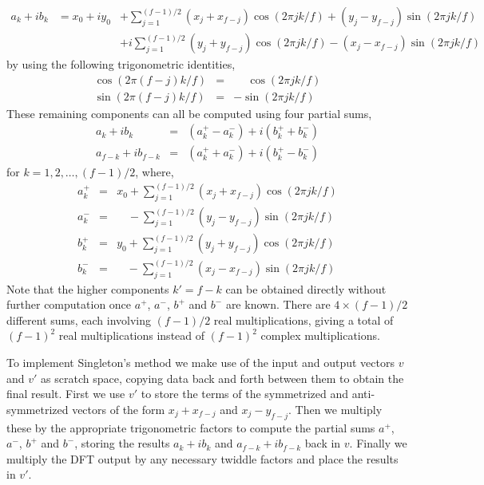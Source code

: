 \documentclass[fleqn,12pt]{article}
\begin{document}
%
\begin{eqnarray}
a_k + i b_k & =   x_0 + i y_0 & + 
  \sum_{j=1}^{(f-1)/2} (x_j + x_{f-j}) \cos(2\pi jk/f)
 + (y_j - y_{f-j}) \sin(2\pi jk/f) \\
& & + i\sum_{j=1}^{(f-1)/2} (y_j + y_{f-j}) \cos(2\pi jk/f) 
 - (x_j - x_{f-j}) \sin(2\pi jk/f)
\end{eqnarray}
%
by using the following trigonometric identities,
%
\begin{eqnarray}
 \cos(2\pi(f-j)k/f) &=& \phantom{-}\cos(2\pi jk/f) \\
 \sin(2\pi(f-j)k/f) &=&  -\sin(2\pi jk/f)
\end{eqnarray}
%
These remaining components can all be computed using four partial
sums,
%
\begin{eqnarray}
a_k + i b_k & = & (a^+_k - a^-_k) + i (b^+_k + b^-_k) \\
a_{f-k} + i b_{f-k} & = & (a^+_k + a^-_k) + i (b^+_k - b^-_k)
\end{eqnarray}
%
for $k = 1, 2, \dots, (f-1)/2$, where,
%
\begin{eqnarray}
a^+_k &=& x_0 + \sum_{j=1}^{(f-1)/2} (x_j + x_{f-j}) \cos(2\pi jk/f) \\
a^-_k &=& \phantom{x_0} - \sum_{j=1}^{(f-1)/2} (y_j - y_{f-j}) \sin(2\pi jk/f) \\
b^+_k &=& y_0 + \sum_{j=1}^{(f-1)/2} (y_j + y_{f-j}) \cos(2\pi jk/f) \\
b^-_k &=& \phantom{y_0} - \sum_{j=1}^{(f-1)/2} (x_j - x_{f-j}) \sin(2\pi jk/f)
\end{eqnarray}
%
Note that the higher components $k'=f-k$ can be obtained directly
without further computation once $a^+$, $a^-$, $b^+$ and $b^-$ are
known. There are $4 \times (f-1)/2$ different sums, each involving
$(f-1)/2$ real multiplications, giving a total of $(f-1)^2$ real
multiplications instead of $(f-1)^2$ complex multiplications.

To implement Singleton's method we make use of the input and output
vectors $v$ and $v'$ as scratch space, copying data back and forth
between them to obtain the final result.  First we use $v'$ to store
the terms of the symmetrized and anti-symmetrized vectors of the form
$x_j + x_{f-j}$ and $x_j - y_{f-j}$. Then we multiply these by the
appropriate trigonometric factors to compute the partial sums $a^+$,
$a^-$, $b^+$ and $b^-$, storing the results $a_k + i b_k$ and $a_{f-k}
+ i b_{f-k}$ back in $v$. Finally we multiply the DFT output by any
necessary twiddle factors and place the results in $v'$.
\end{document}
